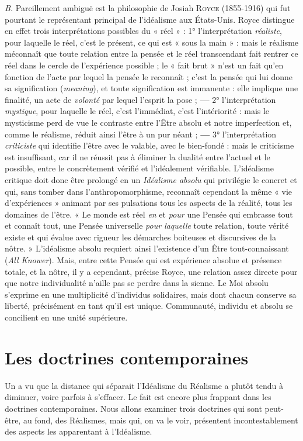 {\it B.} Pareillement ambiguë est la philosophie de Josiah \textsc{Royce} (1855-1916)
qui fut pourtant le représentant principal de l’idéalisme aux États-Unis.
Royce distingue en effet trois interprétations possibles du « réel » : 1°
l’interprétation {\it réaliste}, pour laquelle le réel, c’est le présent, ce qui est « sous
la main » : mais le réalisme méconnaît que toute relation entre la pensée
et le réel transcendant fait rentrer ce réel dans le cercle de l'expérience
possible ; le « fait brut » n’est un fait qu’en fonction de l'acte par lequel
la pensée le reconnaît ; c’est la pensée qui lui donne sa signification ({\it meaning}),
et toute signification est immanente : elle implique une finalité,
un acte de {\it volonté} par lequel l'esprit la pose ; {\bf —} 2° l'interprétation {\it mystique},
pour laquelle le réel, c’est l'immédiat, c’est l’intériorité : mais le mysticisme
perd de vue le contraste entre l’Être absolu et notre imperfection et, comme
le réalisme, réduit ainsi l’être à un pur néant ; {\bf —} 3° l'interprétation {\it criticiste}
qui identifie l'être avec le valable, avec le bien-fondé : mais le criticisme
est insuffisant, car il ne réussit pas à éliminer la dualité entre l’actuel et le
possible, entre le concrètement vérifié et l’idéalement vérifiable. L'idéalisme
critique doit donc être prolongé en un \textsf{\textit {Idéalisme absolu}} qui privilégie le
concret et qui, sans tomber dans l’anthropomorphisme, reconnaît cependant
la même « vie d'expériences » animant par ses pulsations tous les aspects de
la réalité, tous les domaines de l'être. « Le monde est réel {\it en} et {\it pour} une
Pensée qui embrasse tout et connaît tout, une Pensée universelle {\it pour
laquelle} toute relation, toute vérité existe et qui évalue avec rigueur les
démarches boiteuses et discursives de la nôtre. » L’idéalisme absolu requiert
ainsi l’existence d’un Être tout-connaissant ({\it All Knower}). Mais, entre cette
Pensée qui est expérience absolue et présence totale, et la nôtre, il y a
cependant, précise Royce, une relation assez directe pour que notre individualité
n’aille pas se perdre dans la sienne. Le Moi absolu s'exprime en une
multiplicité d'individus solidaires, mais dont chacun conserve sa liberté,
précisément en tant qu'il est unique. Communauté, individu et absolu se
concilient en une unité supérieure.

\section{Les doctrines contemporaines}%
Un a vu que la distance
qui séparait l’Idéalisme du Réalisme a plutôt tendu à diminuer, voire
parfois à s’effacer. Le fait est encore plus frappant dans les doctrines
contemporaines. Nous allons examiner trois doctrines qui sont peut-être,
au fond, des Réalismes, mais qui, on va le voir, présentent incontestablement
des aspects les apparentant à l’Idéalisme.

